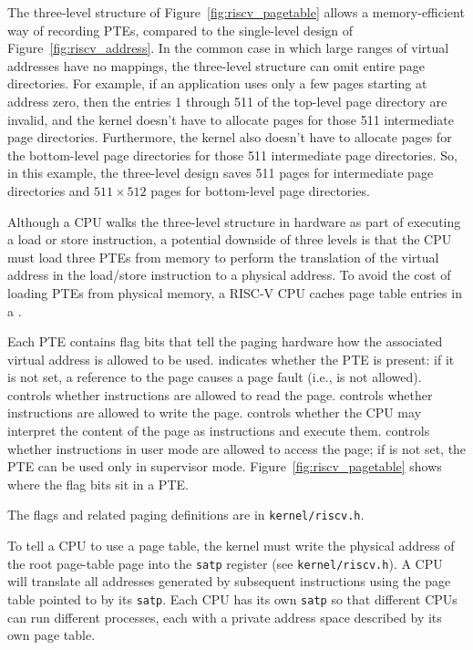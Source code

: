 The three-level structure of Figure~\ref{fig:riscv_pagetable} allows a
memory-efficient way of recording PTEs, compared to the single-level
design of Figure~\ref{fig:riscv_address}. In the common case in which
large ranges of virtual addresses have no mappings, the three-level
structure can omit entire page directories. For example, if an
application uses only a few pages starting at address zero, then the
entries 1 through 511 of the top-level page directory are invalid, and
the kernel doesn't have to allocate pages for those 511 intermediate
page directories. Furthermore, the kernel also doesn't have to allocate
pages for the bottom-level page directories for those 511 intermediate
page directories. So, in this example, the three-level design saves 511
pages for intermediate page directories and $511\times512$ pages for
bottom-level page directories.

Although a CPU walks the three-level structure in hardware as part of
executing a load or store instruction, a potential downside of three
levels is that the CPU must load three PTEs from memory to perform the
translation of the virtual address in the load/store instruction to a
physical address. To avoid the cost of loading PTEs from physical
memory, a RISC-V CPU caches page table entries in a
.

Each PTE contains flag bits that tell the paging hardware how the
associated virtual address is allowed to be used.
 indicates whether the PTE is present: if it is not
set, a reference to the page causes a page fault (i.e., is not allowed).
 controls whether instructions are allowed to read the page.
 controls whether instructions are allowed to write the page.
 controls whether the CPU may interpret the content of the
page as instructions and execute them.
 controls whether instructions in user mode are allowed to
access the page; if  is not set, the PTE can be used only in
supervisor mode. Figure~\ref{fig:riscv_pagetable} shows where the flag bits sit
in a PTE.

The flags and related paging definitions are in \texttt{kernel/riscv.h}.

To tell a CPU to use a page table, the kernel must write the physical
address of the root page-table page into the \texttt{satp} register
(see \texttt{kernel/riscv.h}). A CPU will translate all addresses
generated by subsequent instructions using the page table pointed to by
its \texttt{satp}. Each CPU has its own \texttt{satp} so that different
CPUs can run different processes, each with a private address space
described by its own page table.

